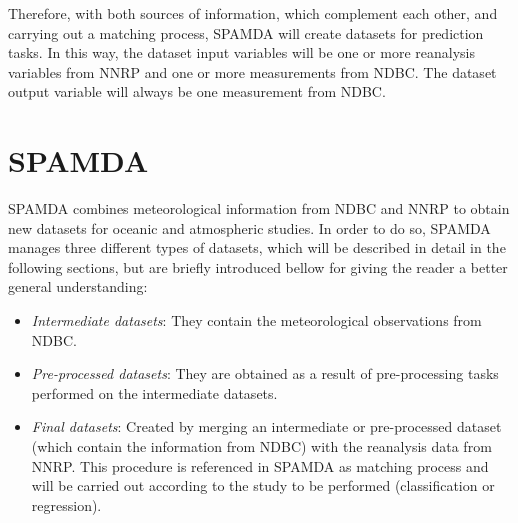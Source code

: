 \documentclass[review]{elsarticle}
\begin{document}
		
		Therefore, with both sources of information, which complement each other, and carrying out a matching process, SPAMDA will create datasets for prediction tasks. In this way, the dataset input variables will be one or more reanalysis variables from NNRP and one or more measurements from NDBC. The dataset output variable will always be one measurement from NDBC.
		
	\section{SPAMDA}\label{sec:SPAMDA}
		
		SPAMDA combines  meteorological information from NDBC and NNRP to obtain new datasets for oceanic and atmospheric studies. In order to do so, SPAMDA manages three different types of datasets, which will be described in detail in the following sections, but are briefly introduced bellow for giving the reader a better general understanding:
			\begin{itemize}
				\item \textit{Intermediate datasets}: They contain the meteorological observations from NDBC.
				\item \textit{Pre-processed datasets}: They are obtained as a result of pre-processing tasks performed on the intermediate datasets.
				\item \textit{Final datasets}: Created by merging an intermediate or pre-processed dataset (which contain the information from NDBC) with the reanalysis data from NNRP. This procedure is referenced in SPAMDA as matching process and will be carried out according to the study to be performed (classification or regression).
			\end{itemize}
		
\end{document}
